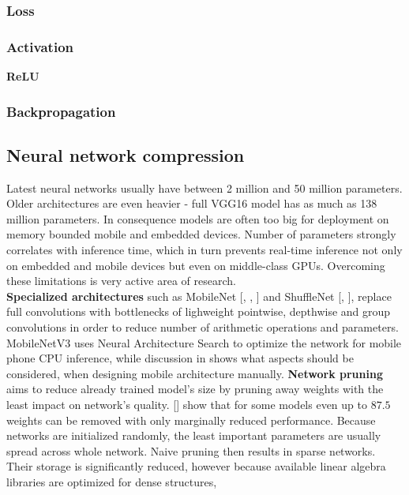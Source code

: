 \documentclass[../Main.tex]{subfiles}
\begin{document}
    \subsubsection{Loss} %
    \subsubsection{Activation}
        \textbf{ReLU}
    \subsubsection{Backpropagation}

\subsection{Neural network compression}
    Latest neural networks usually have between 2 million and 50 million parameters.
    Older architectures are even heavier - full VGG16 model has as much as
    138 million parameters. In consequence models 
    are often too big for deployment on memory bounded mobile and embedded devices.
    Number of parameters strongly correlates with inference time, which in turn
    prevents real-time inference not only on embedded and mobile
    devices but even on middle-class GPUs. Overcoming these limitations 
    is very active area of research.\\
    \textbf{Specialized architectures} such as MobileNet [\cite{mobilenetv1},
    \cite{mobilenetv2}, \cite{mobilenetv3}] and ShuffleNet [\cite{shufflenetv1},
    \cite{shufflenetv2}], replace full convolutions with bottlenecks of lighweight
    pointwise, depthwise and group convolutions in order to reduce number of 
    arithmetic operations and parameters. MobileNetV3 \cite{mobilenetv3} uses
    Neural Architecture Search to optimize the network for mobile phone CPU
    inference, while discussion in \cite{shufflenetv2} shows what aspects should
    be considered, when designing mobile architecture manually. 
    \textbf{Network pruning} aims to reduce already trained model's size by pruning away
    weights with the least impact on network's quality. [\cite{zhu2017prune}] show
    that for some models even up to $87.5$ weights can be removed with only 
    marginally reduced performance. 
    Because networks are initialized randomly, the least
    important parameters are usually spread across whole network. Naive pruning 
    then results in sparse networks. Their storage is significantly reduced, however
    because available linear algebra libraries are optimized for dense structures,
\end{document}

